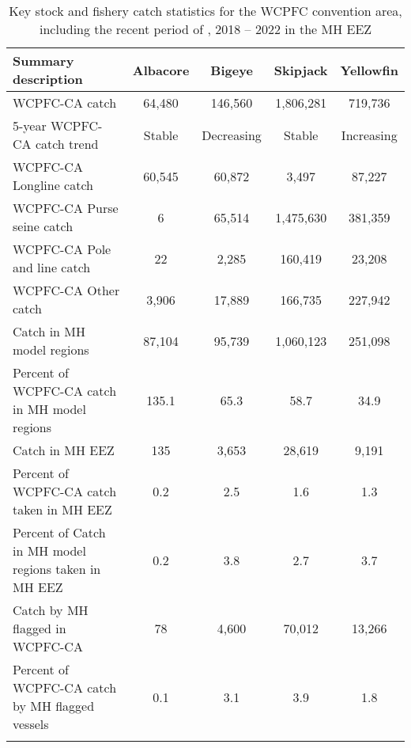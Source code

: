 \begin{longtable}{lcccc}
\caption{Key stock and fishery catch statistics for the WCPFC convention area, including the recent period of , 2018 -- 2022 in the MH EEZ} \\ 
  \hline
Summary description & Albacore & Bigeye & Skipjack & Yellowfin \\ 
  \hline
WCPFC-CA catch & 64,480 & 146,560 & 1,806,281 & 719,736 \\ 
  5-year WCPFC-CA catch trend & Stable & Decreasing & Stable & Increasing \\ 
  WCPFC-CA Longline catch & 60,545 & 60,872 & 3,497 & 87,227 \\ 
  WCPFC-CA Purse seine catch & 6 & 65,514 & 1,475,630 & 381,359 \\ 
  WCPFC-CA Pole and line catch & 22 & 2,285 & 160,419 & 23,208 \\ 
  WCPFC-CA Other catch & 3,906 & 17,889 & 166,735 & 227,942 \\ 
  Catch in MH model regions & 87,104 & 95,739 & 1,060,123 & 251,098 \\ 
  Percent of WCPFC-CA catch in MH model regions & 135.1 & 65.3 & 58.7 & 34.9 \\ 
   \hline
Catch in MH EEZ & 135 & 3,653 & 28,619 & 9,191 \\ 
  Percent of WCPFC-CA catch taken in MH EEZ & 0.2 & 2.5 & 1.6 & 1.3 \\ 
  Percent of Catch in MH model regions taken in MH EEZ & 0.2 & 3.8 & 2.7 & 3.7 \\ 
  Catch by MH flagged in WCPFC-CA & 78 & 4,600 & 70,012 & 13,266 \\ 
  Percent of WCPFC-CA catch by MH flagged vessels & 0.1 & 3.1 & 3.9 & 1.8 \\ 
  \hline
\label{cat_sum_tab}
\end{longtable}
